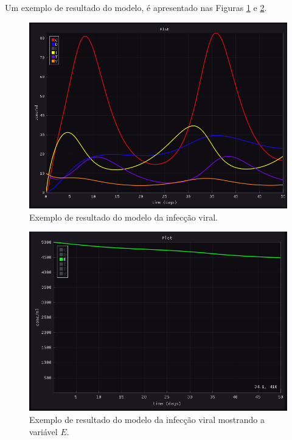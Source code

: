 \documentclass[
	12pt,				%
	openright,			%
	oneside,			%
	a4paper,			%
	main=brazil,
	english,			%
	]{ufsj-abntex2}
\begin{document}
Um exemplo de resultado do modelo, é apresentado nas Figuras \ref{fig:resultado1-infeccaoviral} e \ref{fig:resultado2-infeccaoviral}.

\begin{figure}[h]
    \centering
    \includegraphics[width=\textwidth]{imgs/modelos/resultado1-infeccaoviral.png} 
    \caption{Exemplo de resultado do modelo da infecção viral.}
    \label{fig:resultado1-infeccaoviral}
\end{figure}

\begin{figure}[h]
    \centering
    \includegraphics[width=\textwidth]{imgs/modelos/resultado2-infeccaoviral.png} 
    \caption{Exemplo de resultado do modelo da infecção viral mostrando a variável $E$.}
    \label{fig:resultado2-infeccaoviral}
\end{figure}
\end{document}
